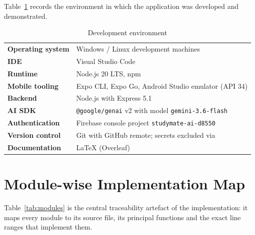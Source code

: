 \documentclass[12pt,a4paper,oneside]{report}
\newcommand{\fp}[1]{\texttt{\small\detokenize{#1}}}
\begin{document}
Table~\ref{tab:env} records the environment in which the application was developed and demonstrated.

\begin{table}[H]
\centering
\caption{Development environment}
\label{tab:env}
\small
\begin{tabularx}{\textwidth}{@{}>{\bfseries}p{4.2cm}X@{}}
\toprule
Operating system    & Windows / Linux development machines \\
IDE                 & Visual Studio Code \\
Runtime             & Node.js 20 LTS, npm \\
Mobile tooling      & Expo CLI, Expo Go, Android Studio emulator (API 34) \\
Backend             & Node.js with Express 5.1 \\
AI SDK              & \texttt{@google/genai} v2 with model \texttt{gemini-3.6-flash} \\
Authentication      & Firebase console project \texttt{studymate-ai-d8550} \\
Version control     & Git with GitHub remote; secrets excluded via \fp{.gitignore} \\
Documentation       & \LaTeX{} (Overleaf) \\
\bottomrule
\end{tabularx}
\end{table}

\section{Module-wise Implementation Map}

Table~\ref{tab:modules} is the central traceability artefact of the implementation:
it maps every module to its source file, its principal functions and the exact line
ranges that implement them.
\end{document}
